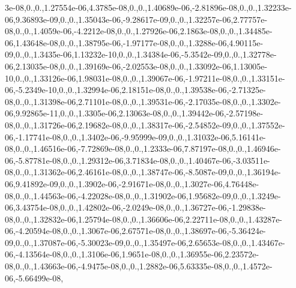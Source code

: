 \begin{DoxyCompactItemize}
3e-\/08,0.,0.,1.\-27554e-\/06,4.\-3785e-\/08,0.,0.,1.\-40689e-\/06,-\/2.\-81896e-\/08,0.,0.,1.\-32233e-\/06,9.\-36893e-\/09,0.,0.,1.\-35043e-\/06,-\/9.\-28617e-\/09,0.,0.,1.\-32257e-\/06,2.\-77757e-\/08,0.,0.,1.\-4059e-\/06,-\/4.\-2212e-\/08,0.,0.,1.\-27926e-\/06,2.\-1863e-\/08,0.,0.,1.\-34485e-\/06,1.\-43648e-\/08,0.,0.,1.\-38795e-\/06,-\/1.\-97177e-\/08,0.,0.,1.\-3288e-\/06,4.\-90115e-\/09,0.,0.,1.\-3435e-\/06,1.\-13232e-\/10,0.,0.,1.\-34384e-\/06,-\/5.\-3542e-\/09,0.,0.,1.\-32778e-\/06,2.\-13035e-\/08,0.,0.,1.\-39169e-\/06,-\/2.\-02553e-\/08,0.,0.,1.\-33092e-\/06,1.\-13005e-\/10,0.,0.,1.\-33126e-\/06,1.\-98031e-\/08,0.,0.,1.\-39067e-\/06,-\/1.\-97211e-\/08,0.,0.,1.\-33151e-\/06,-\/5.\-2349e-\/10,0.,0.,1.\-32994e-\/06,2.\-18151e-\/08,0.,0.,1.\-39538e-\/06,-\/2.\-71325e-\/08,0.,0.,1.\-31398e-\/06,2.\-71101e-\/08,0.,0.,1.\-39531e-\/06,-\/2.\-17035e-\/08,0.,0.,1.\-3302e-\/06,9.\-92865e-\/11,0.,0.,1.\-3305e-\/06,2.\-13063e-\/08,0.,0.,1.\-39442e-\/06,-\/2.\-57198e-\/08,0.,0.,1.\-31726e-\/06,2.\-19682e-\/08,0.,0.,1.\-38317e-\/06,-\/2.\-54852e-\/09,0.,0.,1.\-37552e-\/06,-\/1.\-17741e-\/08,0.,0.,1.\-3402e-\/06,-\/9.\-95999e-\/09,0.,0.,1.\-31032e-\/06,5.\-16141e-\/08,0.,0.,1.\-46516e-\/06,-\/7.\-72869e-\/08,0.,0.,1.\-2333e-\/06,7.\-87197e-\/08,0.,0.,1.\-46946e-\/06,-\/5.\-87781e-\/08,0.,0.,1.\-29312e-\/06,3.\-71834e-\/08,0.,0.,1.\-40467e-\/06,-\/3.\-03511e-\/08,0.,0.,1.\-31362e-\/06,2.\-46161e-\/08,0.,0.,1.\-38747e-\/06,-\/8.\-5087e-\/09,0.,0.,1.\-36194e-\/06,9.\-41892e-\/09,0.,0.,1.\-3902e-\/06,-\/2.\-91671e-\/08,0.,0.,1.\-3027e-\/06,4.\-76448e-\/08,0.,0.,1.\-44563e-\/06,-\/4.\-22028e-\/08,0.,0.,1.\-31902e-\/06,1.\-95682e-\/09,0.,0.,1.\-3249e-\/06,3.\-43754e-\/08,0.,0.,1.\-42802e-\/06,-\/2.\-0249e-\/08,0.,0.,1.\-36727e-\/06,-\/1.\-29838e-\/08,0.,0.,1.\-32832e-\/06,1.\-25794e-\/08,0.,0.,1.\-36606e-\/06,2.\-22711e-\/08,0.,0.,1.\-43287e-\/06,-\/4.\-20594e-\/08,0.,0.,1.\-3067e-\/06,2.\-67571e-\/08,0.,0.,1.\-38697e-\/06,-\/5.\-36424e-\/09,0.,0.,1.\-37087e-\/06,-\/5.\-30023e-\/09,0.,0.,1.\-35497e-\/06,2.\-65653e-\/08,0.,0.,1.\-43467e-\/06,-\/4.\-13564e-\/08,0.,0.,1.\-3106e-\/06,1.\-9651e-\/08,0.,0.,1.\-36955e-\/06,2.\-23572e-\/08,0.,0.,1.\-43663e-\/06,-\/4.\-9475e-\/08,0.,0.,1.\-2882e-\/06,5.\-63335e-\/08,0.,0.,1.\-4572e-\/06,-\/5.\-66499e-\/08,
\end{DoxyCompactItemize}
